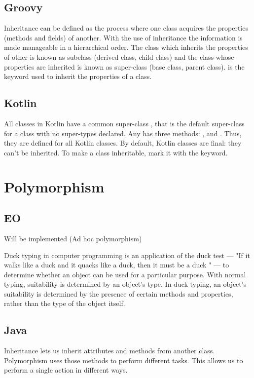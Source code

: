\documentclass[12pt]{book}
\begin{document}
{{\subsection{Groovy}
Inheritance can be defined as the process where one class acquires the properties (methods and fields) of another. With the use of inheritance the information is made manageable in a hierarchical order. The class which inherits the properties of other is known as subclass (derived class, child class) and the class whose  properties are inherited is known as super-class (base class, parent class).  is the keyword used to inherit the properties of a class.

\subsection{Kotlin}
All classes in Kotlin have a common super-class , that is the default super-class for a class with no super-types declared. Any has three methods: ,  and . Thus, they are defined for all Kotlin classes. By default, Kotlin classes are final: they can’t be inherited. To make a class inheritable, mark it with the  keyword.

\section{Polymorphism}

\subsection{EO}
Will be implemented (Ad hoc polymorphism)

Duck typing in computer programming is an application of the duck test — "If it walks like a duck and it quacks like a duck, then it must be a duck " — to determine whether  an object can be used for a particular purpose.  With normal typing, suitability is determined by an object's type. In duck typing, an object's suitability is determined by the presence  of certain methods and properties, rather than the type of the object itself.

\subsection{Java}
Inheritance lets us inherit attributes and methods from another class. Polymorphism uses those methods to perform different tasks. This allows us to perform a single action in different ways.
 
}}
\end{document}

